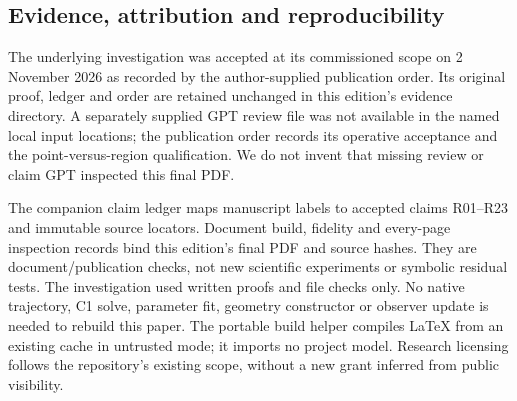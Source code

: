\subsection*{Evidence, attribution and reproducibility}
The underlying investigation was accepted at its commissioned scope on 2 November 2026 as recorded by the author-supplied publication order. Its original proof, ledger and order are retained unchanged in this edition's evidence directory. A separately supplied GPT review file was not available in the named local input locations; the publication order records its operative acceptance and the point-versus-region qualification. We do not invent that missing review or claim GPT inspected this final PDF.

The companion claim ledger maps manuscript labels to accepted claims R01--R23 and immutable source locators. Document build, fidelity and every-page inspection records bind this edition's final PDF and source hashes. They are document/publication checks, not new scientific experiments or symbolic residual tests. The investigation used written proofs and file checks only. No native trajectory, C1 solve, parameter fit, geometry constructor or observer update is needed to rebuild this paper. The portable build helper compiles LaTeX from an existing cache in untrusted mode; it imports no project model. Research licensing follows the repository's existing scope, without a new grant inferred from public visibility.
